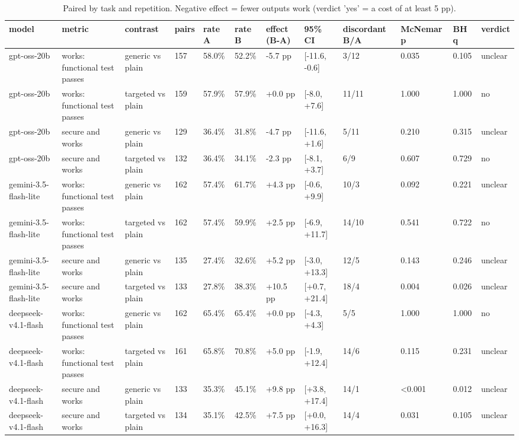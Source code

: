 \begin{table}[t]\centering\small
\caption{Paired by task and repetition. Negative effect = fewer outputs work (verdict 'yes' = a cost of at least 5 pp).}
\begin{tabular}{llllllllllll}
\toprule
model & metric & contrast & pairs & rate A & rate B & effect (B-A) & 95\% CI & discordant B/A & McNemar p & BH q & verdict \\
\midrule
gpt-oss-20b & works: functional test passes & generic vs plain & 157 & 58.0\% & 52.2\% & -5.7 pp & [-11.6, -0.6] & 3/12 & 0.035 & 0.105 & unclear \\
gpt-oss-20b & works: functional test passes & targeted vs plain & 159 & 57.9\% & 57.9\% & +0.0 pp & [-8.0, +7.6] & 11/11 & 1.000 & 1.000 & no \\
gpt-oss-20b & secure and works & generic vs plain & 129 & 36.4\% & 31.8\% & -4.7 pp & [-11.6, +1.6] & 5/11 & 0.210 & 0.315 & unclear \\
gpt-oss-20b & secure and works & targeted vs plain & 132 & 36.4\% & 34.1\% & -2.3 pp & [-8.1, +3.7] & 6/9 & 0.607 & 0.729 & no \\
gemini-3.5-flash-lite & works: functional test passes & generic vs plain & 162 & 57.4\% & 61.7\% & +4.3 pp & [-0.6, +9.9] & 10/3 & 0.092 & 0.221 & unclear \\
gemini-3.5-flash-lite & works: functional test passes & targeted vs plain & 162 & 57.4\% & 59.9\% & +2.5 pp & [-6.9, +11.7] & 14/10 & 0.541 & 0.722 & no \\
gemini-3.5-flash-lite & secure and works & generic vs plain & 135 & 27.4\% & 32.6\% & +5.2 pp & [-3.0, +13.3] & 12/5 & 0.143 & 0.246 & unclear \\
gemini-3.5-flash-lite & secure and works & targeted vs plain & 133 & 27.8\% & 38.3\% & +10.5 pp & [+0.7, +21.4] & 18/4 & 0.004 & 0.026 & unclear \\
deepseek-v4.1-flash & works: functional test passes & generic vs plain & 162 & 65.4\% & 65.4\% & +0.0 pp & [-4.3, +4.3] & 5/5 & 1.000 & 1.000 & no \\
deepseek-v4.1-flash & works: functional test passes & targeted vs plain & 161 & 65.8\% & 70.8\% & +5.0 pp & [-1.9, +12.4] & 14/6 & 0.115 & 0.231 & unclear \\
deepseek-v4.1-flash & secure and works & generic vs plain & 133 & 35.3\% & 45.1\% & +9.8 pp & [+3.8, +17.4] & 14/1 & <0.001 & 0.012 & unclear \\
deepseek-v4.1-flash & secure and works & targeted vs plain & 134 & 35.1\% & 42.5\% & +7.5 pp & [+0.0, +16.3] & 14/4 & 0.031 & 0.105 & unclear \\
\bottomrule
\end{tabular}
\end{table}
